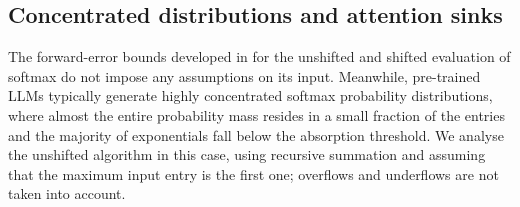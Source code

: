 \documentclass[namedate,webpdf,imanum]{ima-authoring-template}
\numberwithin{equation}{section}
\begin{document}
\subsection{Concentrated distributions and attention sinks}
The forward-error bounds developed in \cite{blanchard2021accurately} for the unshifted and shifted evaluation of softmax do not impose any assumptions on its input.
Meanwhile, pre-trained LLMs typically generate highly concentrated softmax probability distributions, where almost the entire probability mass resides in a small fraction of the entries and the majority of exponentials fall below the absorption threshold.
We analyse the unshifted algorithm in this case, using recursive summation and assuming that the maximum input entry is the first one; overflows and underflows are not taken into account.
\end{document}
